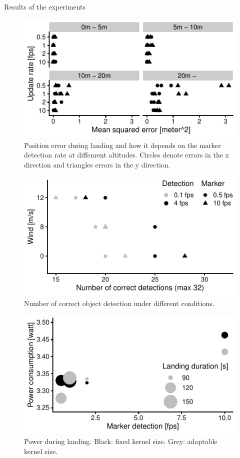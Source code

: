 \documentclass[conference]{IEEEtran}
\begin{document}
Results of the experiments

\begin{figure}
\centering
\includegraphics{data_visualization/QoSLanding.pdf}
\caption{Position error during landing and how it depends 
on the marker detection rate at diffenrent altitudes.
Circles denote errors in the x direction and triangles 
errors in the y direction.}
\label{figPositionErrorDuringLanding}
\end{figure}

\begin{figure}
\centering
\includegraphics{data_visualization/QoSDetection.pdf}
\caption{Number of correct object detection
under different conditions.}
\label{figNCorrectObjectDetections}
\end{figure}

\begin{figure}
\centering
\includegraphics{data_visualization/PowerLanding.pdf}
\caption{Power during landing. 
Black: fixed kernel size. 
Grey: adaptable kernel size.}
\label{figPowerDuringLanding}
\end{figure}
\end{document}
